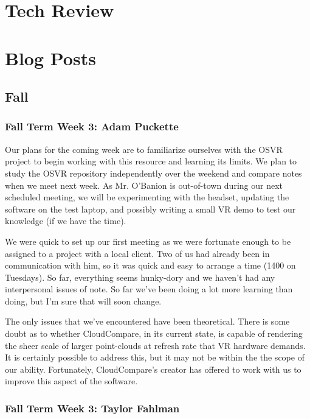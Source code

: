 \documentclass[draftclsnofoot,onecolumn]{IEEEtran}
\begin{document}
\section{Tech Review}

\section{Blog Posts}

\subsection{Fall}

\subsubsection{Fall Term Week 3: Adam Puckette}

Our plans for the coming week are to familiarize ourselves with the OSVR project to begin working with this resource and learning its limits. 
We plan to study the OSVR repository independently over the weekend and compare notes when we meet next week. 
As Mr. O'Banion is out-of-town during our next scheduled meeting, we will be experimenting with the headset, updating the software on the test laptop, and possibly writing a small VR demo to test our knowledge (if we have the time).

We were quick to set up our first meeting as we were fortunate enough to be assigned to a project with a local client. 
Two of us had already been in communication with him, so it was quick and easy to arrange a time (1400 on Tuesdays). 
So far, everything seems hunky-dory and we haven't had any interpersonal issues of note. 
So far we've been doing a lot more learning than doing, but I'm sure that will soon change.

The only issues that we've encountered have been theoretical. 
There is some doubt as to whether CloudCompare, in its current state, is capable of rendering the sheer scale of larger point-clouds at refresh rate that VR hardware demands. 
It is certainly possible to address this, but it may not be within the the scope of our ability. 
Fortunately, CloudCompare's creator has offered to work with us to improve this aspect of the software. 

\subsubsection{Fall Term Week 3: Taylor Fahlman}
\end{document}
